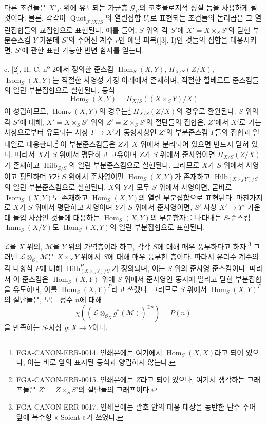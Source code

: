 다른 조건들은 $X'_{s'}$ 위에 유도되는 가군층 $\mathcal G_{s'}$의
코호몰로지적 성질 등을 사용하게 될 것이다. 물론, 각각이
$\operatorname{Quot}_{\mathcal F/X/S}$의 열린집합 $U_i$로 표현되는
조건들의 논리곱은 그 열린집합들의 교집합으로 표현된다. 예를 들어,
$S$ 위의 각 $S'$에 $X'=X\times_SS'$의 닫힌 부분준스킴 $Y$ 가운데
$S'$의 주어진 계수 $r$인 에탈 피복([3], I)인 것들의 집합을 대응시키면,
$S'$에 관한 표현 가능한 반변 함자를 얻는다.

\medskip
\noindent c. [2], II, C, n\textsuperscript{o} 2에서 정의한 준스킴
$\operatorname{Hom}_S(X,Y)$, $\Pi_{X/S}(Z/X)$,
$\operatorname{Isom}_S(X,Y)$는 적절한 사영성 가정 아래에서 존재하며,
적절한 힐베르트 준스킴들의 열린 부분집합으로 실현된다. 등식
\[
\operatorname{Hom}_S(X,Y)=\Pi_{X/S}((X\times_SY)/X)
\]
이 성립하므로, $\operatorname{Hom}_S(X,Y)$의
경우는\footnote{FGA-CANON-ERR-0014. 인쇄본에는 여기에서
$\operatorname{Hom}_S(X,X)$라고 되어 있으나, 이는 바로 앞의 표시된
등식과 양립하지 않는다.} $\Pi_{X/S}(Z/X)$의 경우로 환원된다.
$S$ 위의 각 $S'$에 대해, $X'=X\times_SS'$ 위의
$Z'=Z\times_SS'$의 절단들의 집합은, $Z'$에서 $X'$로 가는 사상으로부터
유도되는 사상 $\Gamma\longrightarrow X'$가 동형사상인 $Z'$의
부분준스킴 $\Gamma$들의 집합과 일대일로 대응한다.\footnote{
FGA-CANON-ERR-0015. 인쇄본에는 $Z$라고 되어 있으나, 여기서 생각하는
그래프들은 $Z'=Z\times_SS'$의 절단들의 그래프이다.} 이 부분준스킴들은
$Z$가 $X$ 위에서 분리되어 있으면 반드시 닫혀 있다. 따라서
$X$가 $S$ 위에서 평탄하고 고유이며 $Z$가 $S$ 위에서 준사영이면
$\Pi_{X/S}(Z/X)$가 존재하고 $\operatorname{Hilb}_{Z/S}$의 열린
부분준스킴으로 실현된다. 그러므로 $X$가 $S$ 위에서 사영이고 평탄하며
$Y$가 $S$ 위에서 준사영이면 $\operatorname{Hom}_S(X,Y)$가 존재하고
$\operatorname{Hilb}_{(X\times_SY)/S}$의 열린 부분준스킴으로 실현된다.
$X$와 $Y$가 모두 $S$ 위에서 사영이면, 곧바로
$\operatorname{Isom}_S(X,Y)$도 존재하고
$\operatorname{Hom}_S(X,Y)$의 열린 부분집합으로 표현된다. 마찬가지로
$X$가 $S$ 위에서 평탄하고 사영이며 $Y$가 $S$ 위에서 준사영이면,
$S'$-사상 $X'\longrightarrow Y'$ 가운데 몰입 사상인 것들에 대응하는
$\operatorname{Hom}_S(X,Y)$의 부분함자를 나타내는 $S$-준스킴
$\operatorname{Imm}_S(X/Y)$도 $\operatorname{Hom}_S(X,Y)$의 열린
부분집합으로 표현된다.

$\mathcal L$을 $X$ 위의, $\mathcal M$을 $Y$ 위의 가역층이라 하고,
각각 $S$에 대해 매우 풍부하다고 하자.\footnote{FGA-CANON-ERR-0017.
인쇄본에는 괄호 안의 대응 대상을 동반한 단수 주어 앞에 복수형
« Soient »가 쓰였다.} 그러면
$\mathcal L\otimes_{\mathcal O_S}\mathcal M$은 $X\times_SY$ 위에서
$S$에 대해 매우 풍부한 층이다. 따라서 유리수 계수의 각 다항식 $P$에
대해 $\operatorname{Hilb}^P_{(X\times_SY)/S}$가 정의되며, 이는 $S$
위의 준사영 준스킴이다. 따라서 이 준스킴은
$\operatorname{Hom}_S(X,Y)$ 위에 $S$ 위에서 준사영인 동시에 열리고
닫힌 부분집합을 유도하며, 이를 $\operatorname{Hom}_S(X,Y)^P$라고
쓰겠다. 그러므로 $S$ 위에서 $\operatorname{Hom}_S(X,Y)^P$의 절단들은,
모든 정수 $n$에 대해
\[
\chi\!\left(\left(\mathcal L\otimes_{\mathcal O_X}g^*(\mathcal M)\right)^{
\otimes n}\right)=P(n)
\]
을 만족하는 $S$-사상 $g:X\longrightarrow Y$이다.

